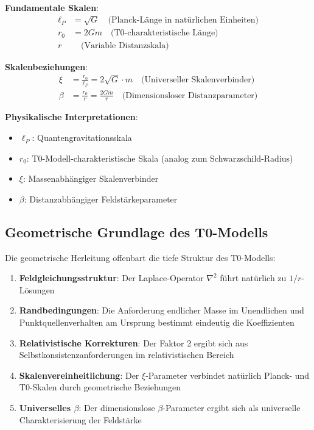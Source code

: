\documentclass[12pt,a4paper]{article}
\begin{document}
\begin{tcolorbox}[colback=blue!5!white,colframe=blue!75!black,title=Vollständige T0-Längenskalen-Hierarchie]
	
	\textbf{Fundamentale Skalen}:
	\begin{align}
		\ell_P &= \sqrt{G} \quad \text{(Planck-Länge in natürlichen Einheiten)} \\
		r_0 &= 2Gm \quad \text{(T0-charakteristische Länge)} \\
		r &\quad \text{(Variable Distanzskala)}
	\end{align}
	
	\textbf{Skalenbeziehungen}:
	\begin{align}
		\xi &= \frac{r_0}{\ell_P} = 2\sqrt{G} \cdot m \quad \text{(Universeller Skalenverbinder)} \\
		\beta &= \frac{r_0}{r} = \frac{2Gm}{r} \quad \text{(Dimensionsloser Distanzparameter)}
	\end{align}
	
	\textbf{Physikalische Interpretationen}:
	\begin{itemize}
		\item $\ell_P$: Quantengravitationsskala
		\item $r_0$: T0-Modell-charakteristische Skala (analog zum Schwarzschild-Radius)
		\item $\xi$: Massenabhängiger Skalenverbinder
		\item $\beta$: Distanzabhängiger Feldstärkeparameter
	\end{itemize}
	
\end{tcolorbox}

\subsection{Geometrische Grundlage des T0-Modells}
\label{subsec:geometric_foundation}

Die geometrische Herleitung offenbart die tiefe Struktur des T0-Modells:

\begin{enumerate}
	\item \textbf{Feldgleichungsstruktur}: Der Laplace-Operator $\nabla^2$ führt natürlich zu $1/r$-Lösungen
	
	\item \textbf{Randbedingungen}: Die Anforderung endlicher Masse im Unendlichen und Punktquellenverhalten am Ursprung bestimmt eindeutig die Koeffizienten
	
	\item \textbf{Relativistische Korrekturen}: Der Faktor 2 ergibt sich aus Selbstkonsistenzanforderungen im relativistischen Bereich
	
	\item \textbf{Skalenvereinheitlichung}: Der $\xi$-Parameter verbindet natürlich Planck- und T0-Skalen durch geometrische Beziehungen
	
	\item \textbf{Universelles $\beta$}: Der dimensionslose $\beta$-Parameter ergibt sich als universelle Charakterisierung der Feldstärke
\end{enumerate}
\end{document}
